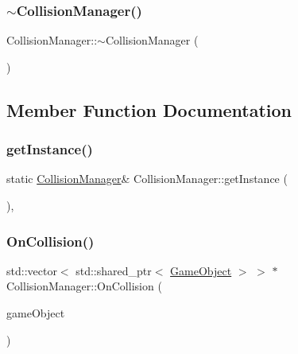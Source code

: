 \subsubsection{\texorpdfstring{$\sim$\+Collision\+Manager()}{~CollisionManager()}}
{\footnotesize\ttfamily Collision\+Manager\+::$\sim$\+Collision\+Manager (\begin{DoxyParamCaption}{ }\end{DoxyParamCaption})}



\subsection{Member Function Documentation}
\mbox{\label{class_collision_manager_af7ae5c9cd14ffea044059e17225d3d1c}} 
\subsubsection{\texorpdfstring{get\+Instance()}{getInstance()}}
{\footnotesize\ttfamily static \mbox{\hyperlink{class_collision_manager}{Collision\+Manager}}\& Collision\+Manager\+::get\+Instance (\begin{DoxyParamCaption}{ }\end{DoxyParamCaption})\hspace{0.3cm}{\ttfamily [inline]}, {\ttfamily [static]}}

\mbox{\label{class_collision_manager_a216d5bbe08e18a3a2aaa46a566b61c94}} 
\subsubsection{\texorpdfstring{On\+Collision()}{OnCollision()}}
{\footnotesize\ttfamily std\+::vector$<$ std\+::shared\+\_\+ptr$<$ \mbox{\hyperlink{class_game_object}{Game\+Object}} $>$ $>$ $\ast$ Collision\+Manager\+::\+On\+Collision (\begin{DoxyParamCaption}\item[{\mbox{\hyperlink{class_game_object}{Game\+Object}} $\ast$}]{game\+Object }\end{DoxyParamCaption})}



